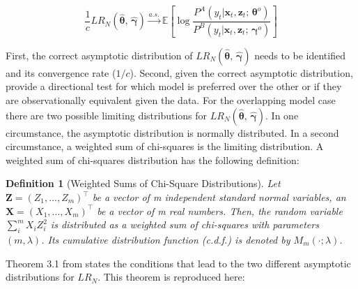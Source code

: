 \documentclass[12pt]{article}
\theoremstyle{definition}
\newtheorem{definition}{Definition}[section]
\begin{document}
\begin{equation} \label{eq:sample_LR_convergence_to_population_LR}
  \frac{1}{c} LR_{N}(\hat{\boldsymbol{\theta}}, \, \hat{\boldsymbol{\gamma}}) \overset{a.s.}{\longrightarrow} \mathbb{E} \left[ \log \frac{P^{A}(y_{t} | \boldsymbol{x}_{t}, \boldsymbol{z}_{t}; \, \boldsymbol{\theta}^{o})}{P^{B}(y_{t} | \boldsymbol{x}_{t}, \boldsymbol{z}_{t}; \, \boldsymbol{\gamma}^{o})} \right]
\end{equation}

First, the correct asymptotic distribution of
$LR_{N}(\hat{\boldsymbol{\theta}}, \, \hat{\boldsymbol{\gamma}})$ needs to be 
identified and its convergence rate ($1/c$). Second, given the correct asymptotic
distribution, provide a directional test for which model is preferred over
the other or if they are observationally equivalent given the data.
For the overlapping model case there are two possible limiting distributions
for $LR_{N}(\hat{\boldsymbol{\theta}}, \, \hat{\boldsymbol{\gamma}})$.
In one circumstance, the asymptotic distribution is normally distributed. In a second
circumstance, a weighted sum of chi-squares is the limiting distribution.
A weighted sum of chi-squares distribution has the following definition:

\begin{definition}[Weighted Sums of Chi-Square Distributions] \label{def:WeightSum_of_ChiSq}
  \emph{Let $\boldsymbol{Z} = (Z_{1}, ..., Z_{m})^{\top}$ be a vector of m independent standard normal variables,
  an $\boldsymbol{X} = (X_{1}, ..., X_{m})^{\top}$ be a vector of m real numbers. Then, the random variable
  $\sum_{i}^{m} X_{i} Z_{i}^{2}$ is distributed as a weighted sum of chi-squares with parameters
  $(m, \lambda)$. Its cumulative distribution function (c.d.f.) is denoted by $M_{m}(\cdot; \lambda)$.}
\end{definition}

Theorem 3.1 from \citet{Voung1989} states the conditions that lead to the two different
asymptotic distributions for $LR_{N}$. This theorem is reproduced here:
\end{document}
